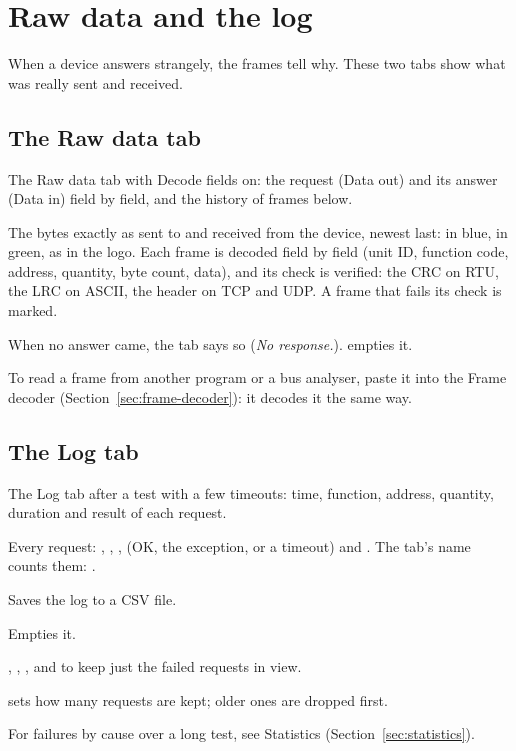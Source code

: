 \chapter{Raw data and the log}

When a device answers strangely, the frames tell why. These two tabs show
what was really sent and received.

\section{The Raw data tab}
\label{sec:raw}

  {The Raw data tab with Decode fields on: the request (Data out) and its
   answer (Data in) field by field, and the history of frames below.}

The bytes exactly as sent to and received from the device, newest last:
 in blue,  in green, as in the logo. Each
frame is decoded field by field (unit ID, function code, address, quantity,
byte count, data), and its check is verified: the CRC on RTU, the LRC on
ASCII, the header on TCP and UDP. A frame that fails its check is marked.

When no answer came, the tab says so (\emph{No response.}). 
empties it.

\begin{tip}
To read a frame from another program or a bus analyser, paste it into the
Frame decoder (Section~\ref{sec:frame-decoder}): it decodes it the same way.
\end{tip}

\section{The Log tab}
\label{sec:log}

  {The Log tab after a test with a few timeouts: time, function, address,
   quantity, duration and result of each request.}

Every request: , ,
,  (OK, the exception, or a timeout) and
. The tab's name counts them: .

\begin{description}[style=nextline, leftmargin=0pt, font=\intermedium]
  \item[\ui{Save log…}] Saves the log to a CSV file.
  \item[\ui{Clear log}] Empties it.
  \item[Right-click] , , , and
     to keep just the failed requests in view.
  \item[Size]  sets how many
    requests are kept; older ones are dropped first.
\end{description}

For failures by cause over a long test, see Statistics
(Section~\ref{sec:statistics}).
